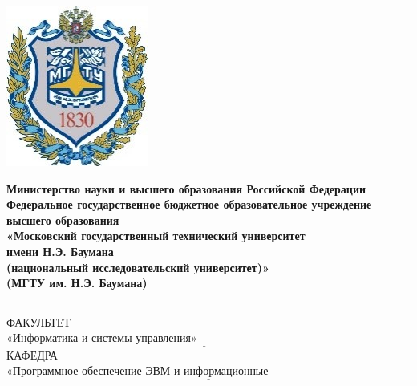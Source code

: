 \begin{titlepage}
	\fontsize{12pt}{12pt}\selectfont
	\noindent \begin{minipage}{0.15\textwidth}
		\includegraphics[width=\linewidth]{img/b_logo.jpg}
	\end{minipage}
	\noindent\begin{minipage}{0.9\textwidth}\centering
		\textbf{Министерство науки и высшего образования Российской Федерации}\\
		\textbf{Федеральное государственное бюджетное образовательное учреждение высшего образования}\\
		\textbf{«Московский государственный технический университет}\\
		\textbf{имени Н.Э. Баумана}\\
		\textbf{(национальный исследовательский университет)»}\\
		\textbf{(МГТУ им. Н.Э. Баумана)}
	\end{minipage}
	
	\noindent\rule{18cm}{3pt}
	\newline\newline
	\noindent ФАКУЛЬТЕТ $\underline{\text{«Информатика и системы управления»~~~~~~~~~~~~~~~~~~~~~~~~~~~~~~~~~~~~~~~~~~~~~~~~~~~~~~~}}$ \newline\newline
	\noindent КАФЕДРА $\underline{\text{«Программное обеспечение ЭВМ и информационные технологии»~~~~~~~~~~~~~~~~~~~~~~~}}$\newline\newline\newline\newline\newline
	

\end{titlepage}
